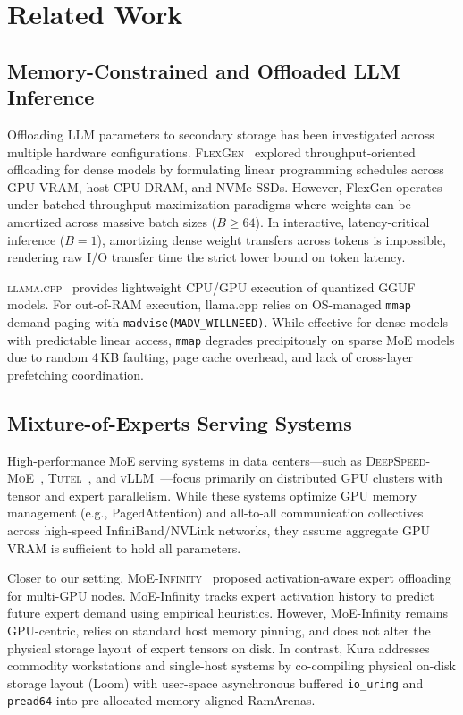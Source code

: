 \section{Related Work}
\label{sec:related_work}

\subsection{Memory-Constrained and Offloaded LLM Inference}
Offloading LLM parameters to secondary storage has been investigated across multiple hardware configurations. \textsc{FlexGen}~\citep{sheng2023flexgen} explored throughput-oriented offloading for dense models by formulating linear programming schedules across GPU VRAM, host CPU DRAM, and NVMe SSDs. However, FlexGen operates under batched throughput maximization paradigms where weights can be amortized across massive batch sizes ($B \ge 64$). In interactive, latency-critical inference ($B=1$), amortizing dense weight transfers across tokens is impossible, rendering raw I/O transfer time the strict lower bound on token latency.

\textsc{llama.cpp}~\citep{gerganov2023llama} provides lightweight CPU/GPU execution of quantized GGUF models. For out-of-RAM execution, llama.cpp relies on OS-managed \texttt{mmap} demand paging with \texttt{madvise(MADV\_WILLNEED)}. While effective for dense models with predictable linear access, \texttt{mmap} degrades precipitously on sparse MoE models due to random 4\,KB faulting, page cache overhead, and lack of cross-layer prefetching coordination.

\subsection{Mixture-of-Experts Serving Systems}
High-performance MoE serving systems in data centers—such as \textsc{DeepSpeed-MoE}~\citep{rajbhandari2022deepspeed}, \textsc{Tutel}~\citep{hwang2023tutel}, and \textsc{vLLM}~\citep{kwon2023vllm}—focus primarily on distributed GPU clusters with tensor and expert parallelism. While these systems optimize GPU memory management (e.g., PagedAttention) and all-to-all communication collectives across high-speed InfiniBand/NVLink networks, they assume aggregate GPU VRAM is sufficient to hold all parameters.

Closer to our setting, \textsc{MoE-Infinity}~\citep{gao2024moeinfinity} proposed activation-aware expert offloading for multi-GPU nodes. MoE-Infinity tracks expert activation history to predict future expert demand using empirical heuristics. However, MoE-Infinity remains GPU-centric, relies on standard host memory pinning, and does not alter the physical storage layout of expert tensors on disk. In contrast, Kura addresses commodity workstations and single-host systems by co-compiling physical on-disk storage layout (Loom) with user-space asynchronous buffered \texttt{io\_uring} and \texttt{pread64} into pre-allocated memory-aligned RamArenas.

